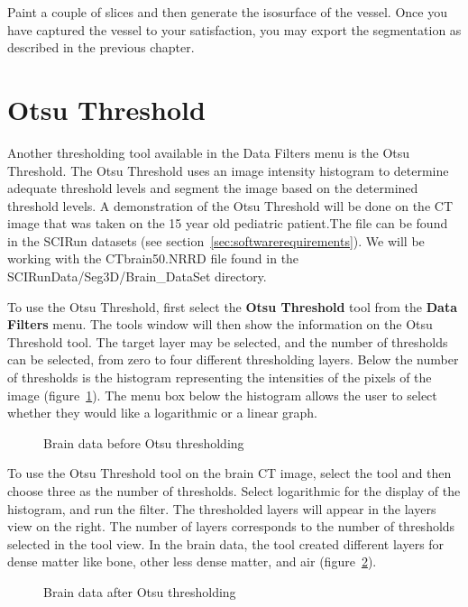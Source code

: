 \documentclass[fleqn,11pt,openany]{book}
\begin{document}
Paint a couple of slices and then generate the isosurface of the vessel. Once you have captured the vessel to your satisfaction, you may export the segmentation as described in the previous chapter.

\section{Otsu Threshold}

Another thresholding tool available in the Data Filters menu is the Otsu Threshold. The Otsu Threshold uses an image intensity histogram to determine adequate threshold levels and segment the image based on the determined threshold levels. A demonstration of the Otsu Threshold will be done on the CT image that was taken on the 15 year old pediatric patient.The file can be found in the SCIRun datasets (see section~\ref{sec:softwarerequirements}). We will be working with the CTbrain50.NRRD file found in the  SCIRunData/Seg3D/Brain\_DataSet directory.

To use the Otsu Threshold, first select the {\bf Otsu Threshold} tool from the {\bf Data Filters} menu. The tools window will then show the information on the Otsu Threshold tool. The target layer may be selected, and the number of thresholds can be selected, from zero to four different thresholding layers. Below the number of thresholds is the histogram representing the intensities of the pixels of the image (figure~\ref{fig:OtsuBefore}). The menu box below the histogram allows the user to select whether they would like a logarithmic or a linear graph.

\begin{figure}
\caption{Brain data before Otsu thresholding}\label{fig:OtsuBefore}
\end{figure}

To use the Otsu Threshold tool on the brain CT image, select the tool and then choose three as the number of thresholds. Select logarithmic for the display of the histogram, and run the filter. The thresholded layers will appear in the layers view on the right. The number of layers corresponds to the number of thresholds selected in the tool view. In the brain data, the tool created different layers for dense matter like bone, other less dense matter, and air (figure~\ref{fig:OtsuAfter}).

\begin{figure}
\caption{Brain data after Otsu thresholding}\label{fig:OtsuAfter}
\end{figure}
\end{document}
